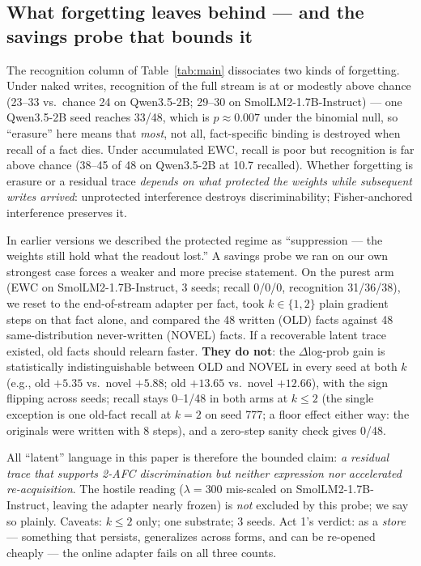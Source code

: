 \documentclass[11pt]{article}
\newcommand{\qwen}{Qwen3.5-2B}
\newcommand{\smol}{SmolLM2-1.7B-Instruct}
\begin{document}
\subsection{What forgetting leaves behind --- and the savings probe that bounds it}
\label{sec:savings}

The recognition column of Table~\ref{tab:main} dissociates two kinds of forgetting. Under naked
writes, recognition of the full stream is at or modestly above chance (23--33 vs.\ chance 24 on
\qwen{}; 29--30 on \smol{}) --- one \qwen{} seed reaches 33/48, which is $p\approx0.007$ under
the binomial null, so ``erasure'' here means that \emph{most}, not all, fact-specific binding is
destroyed when recall of a fact dies. Under accumulated EWC, recall is poor but recognition is
far above chance (38--45 of 48 on \qwen{} at 10.7 recalled). Whether forgetting is erasure or a
residual trace \emph{depends on what protected the weights while subsequent writes arrived}:
unprotected interference destroys discriminability; Fisher-anchored interference preserves it.

In earlier versions we described the protected regime as ``suppression --- the weights still
hold what the readout lost.'' A savings probe we ran on our own strongest case forces a weaker
and more precise statement. On the purest arm (EWC on \smol{}, 3 seeds; recall 0/0/0,
recognition 31/36/38), we reset to the end-of-stream adapter per fact,
took $k\in\{1,2\}$ plain gradient steps on that fact alone, and compared the 48 written (OLD)
facts against 48 same-distribution never-written (NOVEL) facts. If a recoverable latent trace
existed, old facts should relearn faster. \textbf{They do not}: the $\Delta$log-prob gain is
statistically indistinguishable between OLD and NOVEL in every seed at both $k$ (e.g., old
$+5.35$ vs.\ novel $+5.88$; old $+13.65$ vs.\ novel $+12.66$), with the sign flipping across
seeds; recall stays 0--1/48 in both arms at $k\le2$ (the single exception is one old-fact
recall at $k{=}2$ on seed 777; a floor effect either way: the originals were written
with 8 steps), and a zero-step sanity check gives 0/48.

All ``latent'' language in this paper is therefore the bounded claim: \emph{a residual trace
that supports 2-AFC discrimination but neither expression nor accelerated re-acquisition}. The
hostile reading ($\lambda{=}300$ mis-scaled on \smol{}, leaving the adapter nearly frozen) is
\emph{not} excluded by this probe; we say so plainly. Caveats: $k\le2$ only; one substrate;
3 seeds. Act 1's verdict: as a \emph{store} --- something that persists, generalizes across
forms, and can be re-opened cheaply --- the online adapter fails on all three counts.
\end{document}
